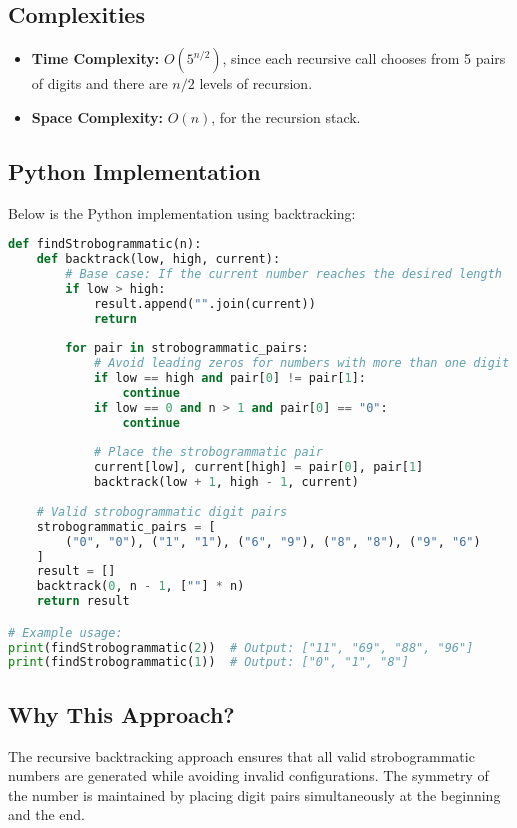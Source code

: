 \subsection*{Complexities}
\begin{itemize}
    \item \textbf{Time Complexity:} \(O(5^{n/2})\), since each recursive call chooses from 5 pairs of digits and there are \(n/2\) levels of recursion.
    \item \textbf{Space Complexity:} \(O(n)\), for the recursion stack.
\end{itemize}

\subsection*{Python Implementation}
Below is the Python implementation using backtracking:

\begin{fullwidth}
\begin{lstlisting}[language=Python]
def findStrobogrammatic(n):
    def backtrack(low, high, current):
        # Base case: If the current number reaches the desired length
        if low > high:
            result.append("".join(current))
            return
        
        for pair in strobogrammatic_pairs:
            # Avoid leading zeros for numbers with more than one digit
            if low == high and pair[0] != pair[1]:
                continue
            if low == 0 and n > 1 and pair[0] == "0":
                continue
            
            # Place the strobogrammatic pair
            current[low], current[high] = pair[0], pair[1]
            backtrack(low + 1, high - 1, current)
    
    # Valid strobogrammatic digit pairs
    strobogrammatic_pairs = [
        ("0", "0"), ("1", "1"), ("6", "9"), ("8", "8"), ("9", "6")
    ]
    result = []
    backtrack(0, n - 1, [""] * n)
    return result

# Example usage:
print(findStrobogrammatic(2))  # Output: ["11", "69", "88", "96"]
print(findStrobogrammatic(1))  # Output: ["0", "1", "8"]
\end{lstlisting}
\end{fullwidth}

\subsection*{Why This Approach?}
The recursive backtracking approach ensures that all valid strobogrammatic numbers are generated while avoiding invalid configurations. The symmetry of the number is maintained by placing digit pairs simultaneously at the beginning and the end.

